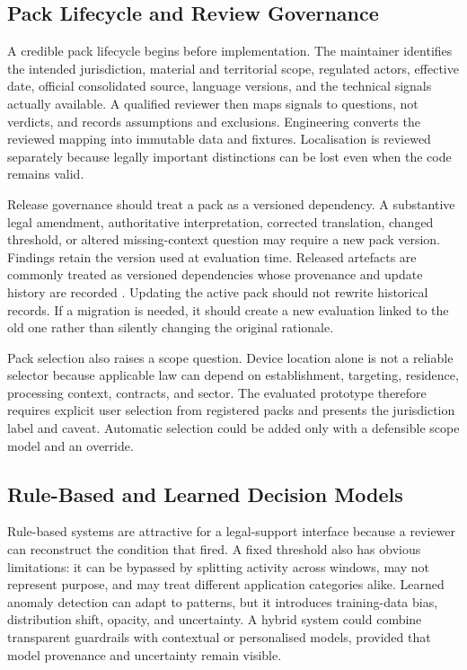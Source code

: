 \subsection{Pack Lifecycle and Review Governance}

A credible pack lifecycle begins before implementation. The maintainer identifies the intended jurisdiction, material and territorial scope, regulated actors, effective date, official consolidated source, language versions, and the technical signals actually available. A qualified reviewer then maps signals to questions, not verdicts, and records assumptions and exclusions. Engineering converts the reviewed mapping into immutable data and fixtures. Localisation is reviewed separately because legally important distinctions can be lost even when the code remains valid.

Release governance should treat a pack as a versioned dependency. A substantive legal amendment, authoritative interpretation, corrected translation, changed threshold, or altered missing-context question may require a new pack version. Findings retain the version used at evaluation time. Released artefacts are commonly treated as versioned dependencies whose provenance and update history are recorded \cite{tufspec,nist80057r5,intotoattestation}. Updating the active pack should not rewrite historical records. If a migration is needed, it should create a new evaluation linked to the old one rather than silently changing the original rationale.

Pack selection also raises a scope question. Device location alone is not a reliable selector because applicable law can depend on establishment, targeting, residence, processing context, contracts, and sector. The evaluated prototype therefore requires explicit user selection from registered packs and presents the jurisdiction label and caveat. Automatic selection could be added only with a defensible scope model and an override.

\subsection{Rule-Based and Learned Decision Models}

Rule-based systems are attractive for a legal-support interface because a reviewer can reconstruct the condition that fired. A fixed threshold also has obvious limitations: it can be bypassed by splitting activity across windows, may not represent purpose, and may treat different application categories alike. Learned anomaly detection can adapt to patterns, but it introduces training-data bias, distribution shift, opacity, and uncertainty. A hybrid system could combine transparent guardrails with contextual or personalised models, provided that model provenance and uncertainty remain visible.

